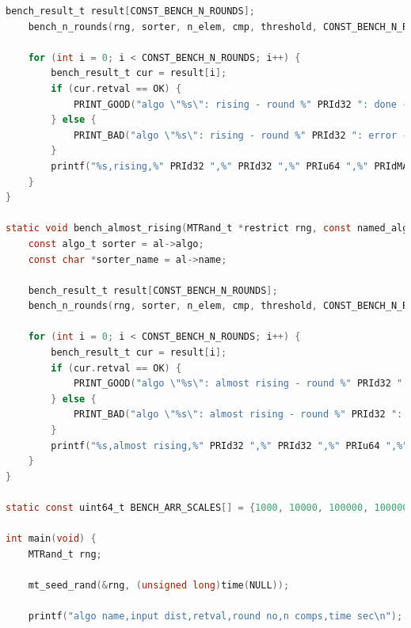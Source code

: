 \documentclass[12pt]{article}
\begin{document}
\begin{lstlisting}[language=C]
    bench_result_t result[CONST_BENCH_N_ROUNDS];
    bench_n_rounds(rng, sorter, n_elem, cmp, threshold, CONST_BENCH_N_ROUNDS, gen_rising_data, result);

    for (int i = 0; i < CONST_BENCH_N_ROUNDS; i++) {
        bench_result_t cur = result[i];
        if (cur.retval == OK) {
            PRINT_GOOD("algo \"%s\": rising - round %" PRId32 ": done - %" PRIu64 " comps - %" PRIdMAX ".%09" PRId32 " sec\n", sorter_name, i + 1, cur.comp_count, (intmax_t)cur.diff.tv_sec, cur.diff.tv_nsec);
        } else {
            PRINT_BAD("algo \"%s\": rising - round %" PRId32 ": error - %" PRIu64 " comps - %" PRIdMAX ".%09" PRId32 " sec\n", sorter_name, i + 1, cur.comp_count, (intmax_t)cur.diff.tv_sec, cur.diff.tv_nsec);
        }
        printf("%s,rising,%" PRId32 ",%" PRId32 ",%" PRIu64 ",%" PRIdMAX ".%09" PRId32 "\n", sorter_name, cur.retval, i + 1, cur.comp_count, (intmax_t)cur.diff.tv_sec, cur.diff.tv_nsec);
    }
}

static void bench_almost_rising(MTRand_t *restrict rng, const named_algo_t *restrict al, size_t n_elem, comp_t cmp, uint64_t threshold) {
    const algo_t sorter = al->algo;
    const char *sorter_name = al->name;

    bench_result_t result[CONST_BENCH_N_ROUNDS];
    bench_n_rounds(rng, sorter, n_elem, cmp, threshold, CONST_BENCH_N_ROUNDS, gen_almost_rising_data, result);

    for (int i = 0; i < CONST_BENCH_N_ROUNDS; i++) {
        bench_result_t cur = result[i];
        if (cur.retval == OK) {
            PRINT_GOOD("algo \"%s\": almost rising - round %" PRId32 ": done - %" PRIu64 " comps - %" PRIdMAX ".%09" PRId32 " sec\n", sorter_name, i + 1, cur.comp_count, (intmax_t)cur.diff.tv_sec, cur.diff.tv_nsec);
        } else {
            PRINT_BAD("algo \"%s\": almost rising - round %" PRId32 ": error - %" PRIu64 " comps - %" PRIdMAX ".%09" PRId32 " sec\n", sorter_name, i + 1, cur.comp_count, (intmax_t)cur.diff.tv_sec, cur.diff.tv_nsec);
        }
        printf("%s,almost rising,%" PRId32 ",%" PRId32 ",%" PRIu64 ",%" PRIdMAX ".%09" PRId32 "\n", sorter_name, cur.retval, i + 1, cur.comp_count, (intmax_t)cur.diff.tv_sec, cur.diff.tv_nsec);
    }
}

static const uint64_t BENCH_ARR_SCALES[] = {1000, 10000, 100000, 1000000, 10000000};

int main(void) {
    MTRand_t rng;

    mt_seed_rand(&rng, (unsigned long)time(NULL));

    printf("algo name,input dist,retval,round no,n comps,time sec\n");


\end{lstlisting}
\end{document}
